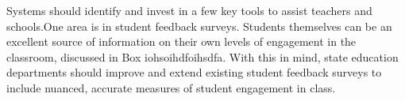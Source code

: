 Systems should identify and invest in a few key tools to assist teachers and schools.One area is in student feedback surveys. Students themselves can be an excellent source of information on their own levels of engagement in the classroom, discussed in %
Box iohsoihdfoihsdfa\@.
With this in mind, state education departments should improve and extend existing student feedback surveys to include nuanced, accurate measures of student engagement in class. 